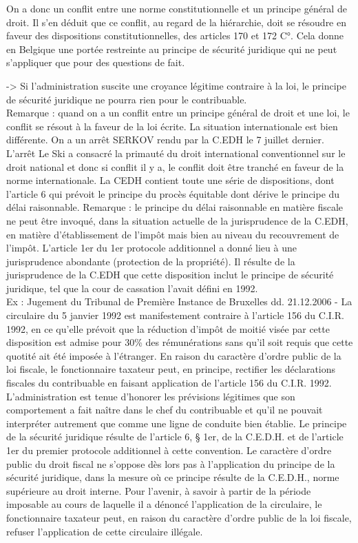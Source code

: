 \documentclass{book}
\begin{document}
On a donc un conflit entre une norme constitutionnelle et un principe général de droit. Il s’en déduit que ce conflit, au regard de la hiérarchie, doit se résoudre en faveur des dispositions constitutionnelles, des articles 170 et 172 C°. Cela donne en Belgique une portée restreinte au principe de sécurité juridique qui ne peut s’appliquer que pour des questions de fait. 

-> Si l’administration suscite une croyance légitime contraire à la loi, le principe de sécurité juridique ne pourra rien pour le contribuable. \\

Remarque : quand on a un conflit entre un principe général de droit et une loi, le conflit se résout à la faveur de la loi écrite. 
La situation internationale est bien différente. On a un arrêt SERKOV rendu par la C.EDH le 7 juillet dernier. 
L’arrêt Le Ski a consacré la primauté du droit international conventionnel sur le droit national et donc si conflit il y a, le conflit doit être tranché en faveur de la norme internationale. 
La CEDH contient toute une série de dispositions, dont l’article 6 qui prévoit le principe du procès équitable dont dérive le principe du délai raisonnable. Remarque : le principe du délai raisonnable en matière fiscale ne peut être invoqué, dans la situation actuelle de la jurisprudence de la C.EDH,  en matière d’établissement de l’impôt mais bien au niveau du recouvrement de l’impôt. 
L’article 1er du 1er protocole additionnel a donné lieu à une jurisprudence abondante (protection de la propriété). Il résulte de la jurisprudence de la C.EDH que cette disposition inclut le principe de sécurité juridique, tel que la cour de cassation l’avait défini en 1992. \\

Ex : Jugement du Tribunal de Première Instance de Bruxelles dd. 21.12.2006 -     La circulaire du 5 janvier 1992 est manifestement contraire à l’article 156 du C.I.R. 1992, en ce qu’elle prévoit que la réduction d’impôt de moitié visée par cette disposition est admise pour 30\% des rémunérations sans qu’il soit requis que cette quotité ait été imposée à l’étranger. En raison du caractère d’ordre public de la loi fiscale, le fonctionnaire taxateur peut, en principe, rectifier les déclarations fiscales du contribuable en faisant application de l’article 156 du C.I.R. 1992. L’administration est tenue d’honorer les prévisions légitimes que son comportement a fait naître dans le chef du contribuable et qu’il ne pouvait interpréter autrement que comme une ligne de conduite bien établie. Le principe de la sécurité juridique résulte de l’article 6, § 1er, de la C.E.D.H. et de l’article 1er du premier protocole additionnel à cette convention. Le caractère d’ordre public du droit fiscal ne s’oppose dès lors pas à l’application du principe de la sécurité juridique, dans la mesure où ce principe résulte de la C.E.D.H., norme supérieure au droit interne. Pour l’avenir, à savoir à partir de la période imposable au cours de laquelle il a dénoncé l’application de la circulaire, le fonctionnaire taxateur peut, en raison du caractère d’ordre public de la loi fiscale, refuser l’application de cette circulaire illégale. \\
    
\end{document}
